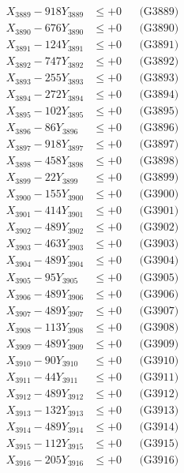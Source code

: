\documentclass[a4paper,10pt]{article}
\begin{document}
{\begin{align}
X_{3889} - 918Y_{3889} &\leq +0 && \text{(G3889)} \\
X_{3890} - 676Y_{3890} &\leq +0 && \text{(G3890)} \\
\allowbreak
X_{3891} - 124Y_{3891} &\leq +0 && \text{(G3891)} \\
X_{3892} - 747Y_{3892} &\leq +0 && \text{(G3892)} \\
X_{3893} - 255Y_{3893} &\leq +0 && \text{(G3893)} \\
X_{3894} - 272Y_{3894} &\leq +0 && \text{(G3894)} \\
X_{3895} - 102Y_{3895} &\leq +0 && \text{(G3895)} \\
X_{3896} - 86Y_{3896} &\leq +0 && \text{(G3896)} \\
X_{3897} - 918Y_{3897} &\leq +0 && \text{(G3897)} \\
X_{3898} - 458Y_{3898} &\leq +0 && \text{(G3898)} \\
X_{3899} - 22Y_{3899} &\leq +0 && \text{(G3899)} \\
X_{3900} - 155Y_{3900} &\leq +0 && \text{(G3900)} \\
\allowbreak
X_{3901} - 414Y_{3901} &\leq +0 && \text{(G3901)} \\
X_{3902} - 489Y_{3902} &\leq +0 && \text{(G3902)} \\
X_{3903} - 463Y_{3903} &\leq +0 && \text{(G3903)} \\
X_{3904} - 489Y_{3904} &\leq +0 && \text{(G3904)} \\
X_{3905} - 95Y_{3905} &\leq +0 && \text{(G3905)} \\
X_{3906} - 489Y_{3906} &\leq +0 && \text{(G3906)} \\
X_{3907} - 489Y_{3907} &\leq +0 && \text{(G3907)} \\
X_{3908} - 113Y_{3908} &\leq +0 && \text{(G3908)} \\
X_{3909} - 489Y_{3909} &\leq +0 && \text{(G3909)} \\
X_{3910} - 90Y_{3910} &\leq +0 && \text{(G3910)} \\
\allowbreak
X_{3911} - 44Y_{3911} &\leq +0 && \text{(G3911)} \\
X_{3912} - 489Y_{3912} &\leq +0 && \text{(G3912)} \\
X_{3913} - 132Y_{3913} &\leq +0 && \text{(G3913)} \\
X_{3914} - 489Y_{3914} &\leq +0 && \text{(G3914)} \\
X_{3915} - 112Y_{3915} &\leq +0 && \text{(G3915)} \\
X_{3916} - 205Y_{3916} &\leq +0 && \text{(G3916)} \\

\end{align}}
\end{document}
